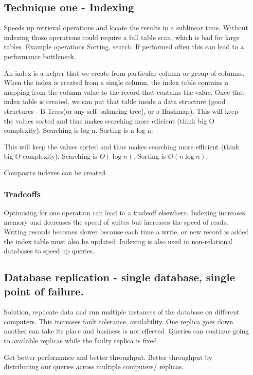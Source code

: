 \subsection{Technique one - Indexing}
Speeds up retrieval operations and locate the results in a sublinear time.
Without indexing those operations could require a full table scan, which is bad for large tables.
Example operations
Sorting, search.
If performed often this can lead to a performance bottleneck.

An index is a helper that we create from particular column or group of columns.
When the index is created from a single column, the index table contains a mapping from the column value to the record that contains the value.
Once that index table is created, we can put that table inside a data structure (good structures - B-Trees(or any self-balancing tree), or a Hashmap).
This will keep the values sorted and thus makes searching more efficient (think big O complexity).
Searching is log n.
Sorting is n log n.

This will keep the values sorted and thus makes searching more efficient (think big‑$O$ complexity).
Searching is $O(\log n)$.
Sorting is $O(n \log n)$.

Composite indexes can be created.


\subsubsection{Tradeoffs}
Optimising for one operation can lead to a tradeoff elsewhere.
Indexing increases memory and decreases the speed of writes but increases the speed of reads.
Writing records becomes slower because each time a write, or new record is added the index table must also be updated.
Indexing is also used in non-relational databases to speed up queries.

\subsection{Database replication - single database, single point of failure.}
Solution, replicate data and run multiple instances of the database on different computers.
This increases fault tolerance, availability.
One replica goes down another can take its place and business is not effected.
Queries can continue going to available replicas while the faulty replica is fixed.

Get better performance and better throughput.
Better throughput by distributing our queries across multiple computers/ replicas.

